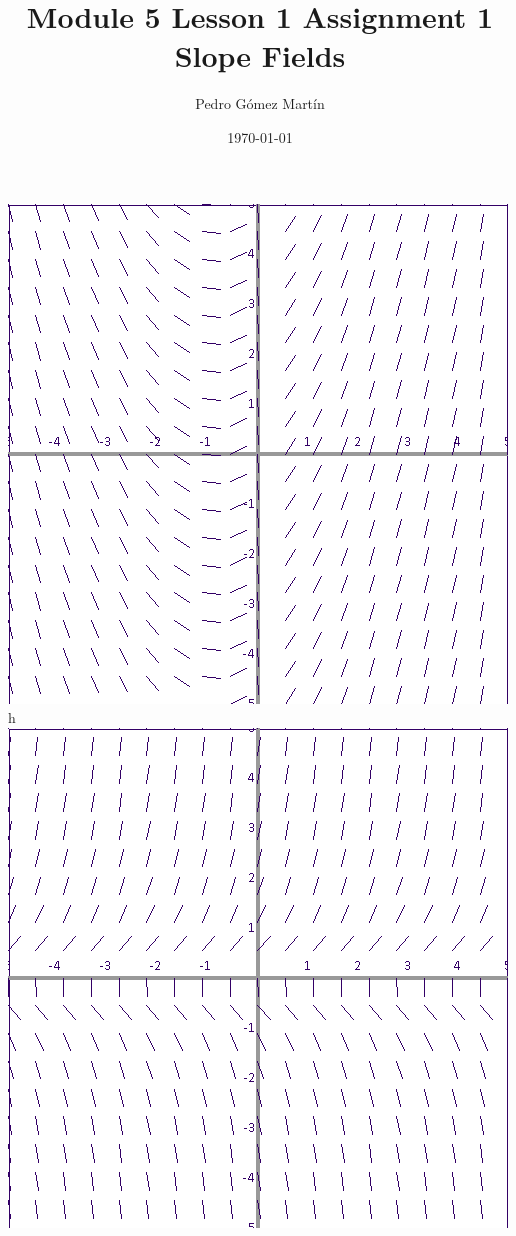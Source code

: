 \documentclass{article}
\author{Pedro G\'{o}mez Mart\'{i}n}
\date{\today}
\title{Module 5 Lesson 1 Assignment 1 Slope Fields}
\begin{document}
\maketitle
\includegraphics[width=\textwidth]{1}
h\\
\includegraphics[width=\textwidth]{2}\\
\end{document}
